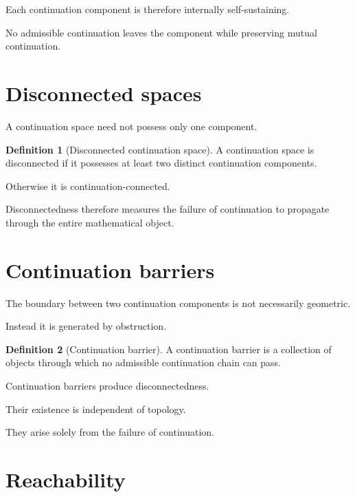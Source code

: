 \documentclass[13pt,openany]{book}
\theoremstyle{plain}
\theoremstyle{definition}
\newtheorem{definition}{Definition}[chapter]
\begin{document}
Each continuation component is therefore internally self-sustaining.

No admissible continuation leaves the component while preserving mutual
continuation.

\section{Disconnected spaces}

A continuation space need not possess only one component.

\begin{definition}[Disconnected continuation space]
A continuation space is disconnected if it possesses at least two distinct
continuation components.

Otherwise it is continuation-connected.
\end{definition}

Disconnectedness therefore measures the failure of continuation to propagate
through the entire mathematical object.

\section{Continuation barriers}

The boundary between two continuation components is not necessarily geometric.

Instead it is generated by obstruction.

\begin{definition}[Continuation barrier]
A continuation barrier is a collection of objects through which no admissible
continuation chain can pass.
\end{definition}

Continuation barriers produce disconnectedness.

Their existence is independent of topology.

They arise solely from the failure of continuation.

\section{Reachability}
\end{document}
